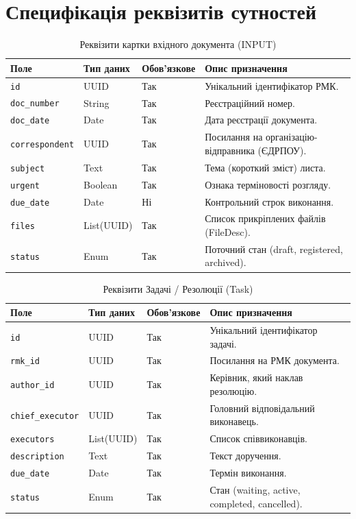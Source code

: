 \documentclass{article}
\begin{document}
\newpage
\appendix
\section{Специфікація реквізитів сутностей}

\begin{longtable}{p{3cm}p{3cm}p{2cm}p{6cm}}
\caption{Реквізити картки вхідного документа (INPUT)} \\
\toprule
\textbf{Поле} & \textbf{Тип даних} & \textbf{Обов'язкове} & \textbf{Опис призначення} \\
\midrule
\texttt{id} & UUID & Так & Унікальний ідентифікатор РМК. \\
\texttt{doc\_number} & String & Так & Реєстраційний номер. \\
\texttt{doc\_date} & Date & Так & Дата реєстрації документа. \\
\texttt{correspondent} & UUID & Так & Посилання на організацію-відправника (ЄДРПОУ). \\
\texttt{subject} & Text & Так & Тема (короткий зміст) листа. \\
\texttt{urgent} & Boolean & Так & Ознака терміновості розгляду. \\
\texttt{due\_date} & Date & Ні & Контрольний строк виконання. \\
\texttt{files} & List(UUID) & Так & Список прикріплених файлів (FileDesc). \\
\texttt{status} & Enum & Так & Поточний стан (draft, registered, archived). \\
\bottomrule
\end{longtable}

\begin{longtable}{p{3cm}p{3cm}p{2cm}p{6cm}}
\caption{Реквізити Задачі / Резолюції (Task)} \\
\toprule
\textbf{Поле} & \textbf{Тип даних} & \textbf{Обов'язкове} & \textbf{Опис призначення} \\
\midrule
\texttt{id} & UUID & Так & Унікальний ідентифікатор задачі. \\
\texttt{rmk\_id} & UUID & Так & Посилання на РМК документа. \\
\texttt{author\_id} & UUID & Так & Керівник, який наклав резолюцію. \\
\texttt{chief\_executor} & UUID & Так & Головний відповідальний виконавець. \\
\texttt{executors} & List(UUID) & Так & Список співвиконавців. \\
\texttt{description} & Text & Так & Текст доручення. \\
\texttt{due\_date} & Date & Так & Термін виконання. \\
\texttt{status} & Enum & Так & Стан (waiting, active, completed, cancelled). \\
\bottomrule
\end{longtable}
\end{document}
